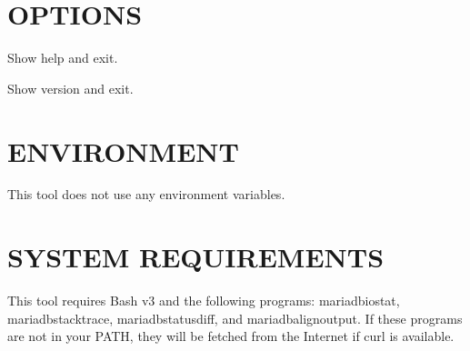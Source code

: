 \documentclass[letterpaper,10pt,english]{sphinxmanual}
\begin{document}
\section{OPTIONS}
\label{\detokenize{mariadb-stat-browser:options}}

\begin{fulllineitems}
\label{\detokenize{mariadb-stat-browser:cmdoption-mariadb-stat-browser-help}}
\sphinxAtStartPar
Show help and exit.

\end{fulllineitems}


\begin{fulllineitems}
\label{\detokenize{mariadb-stat-browser:cmdoption-mariadb-stat-browser-version}}
\sphinxAtStartPar
Show version and exit.

\end{fulllineitems}



\section{ENVIRONMENT}
\label{\detokenize{mariadb-stat-browser:environment}}
\sphinxAtStartPar
This tool does not use any environment variables.


\section{SYSTEM REQUIREMENTS}
\label{\detokenize{mariadb-stat-browser:system-requirements}}
\sphinxAtStartPar
This tool requires Bash v3 and the following programs: mariadb\sphinxhyphen{}iostat, mariadb\sphinxhyphen{}stacktrace,
mariadb\sphinxhyphen{}status\sphinxhyphen{}diff, and mariadb\sphinxhyphen{}align\sphinxhyphen{}output.  If these programs are not in your PATH,
they will be fetched from the Internet if curl is available.
\end{document}
